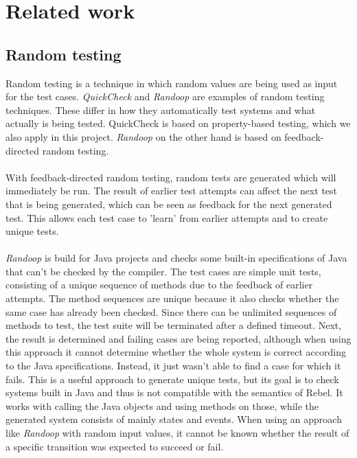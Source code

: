 \section{Related work}

\subsection{Random testing}
Random testing is a technique in which random values are being used as input for the test cases. \textit{QuickCheck} \cite{claessen2011quickcheck} and \textit{Randoop} \cite{pacheco2007randoop} are examples of random testing techniques. These differ in how they automatically test systems and what actually is being tested. QuickCheck is based on property-based testing, which we also apply in this project. \textit{Randoop} on the other hand is based on feedback-directed random testing.\\
\\
With feedback-directed random testing, random tests are generated which will immediately be run. The result of earlier test attempts can affect the next test that is being generated, which can be seen as feedback for the next generated test. This allows each test case to 'learn' from earlier attempts and to create unique tests.\\
\\
\textit{Randoop} is build for Java projects and checks some built-in specifications of Java that can't be checked by the compiler. The test cases are simple unit tests, consisting of a unique sequence of methods due to the feedback of earlier attempts. The method sequences are unique because it also checks whether the same case has already been checked. Since there can be unlimited sequences of methods to test, the test suite will be terminated after a defined timeout. Next, the result is determined and failing cases are being reported, although when using this approach it cannot determine whether the whole system is correct according to the Java specifications. Instead, it just wasn't able to find a case for which it fails. This is a useful approach to generate unique tests, but its goal is to check systems built in Java and thus is not compatible with the semantics of Rebel. It works with calling the Java objects and using methods on those, while the generated system consists of mainly states and events. When using an approach like \textit{Randoop} with random input values, it cannot be known whether the result of a specific transition was expected to succeed or fail.\\
